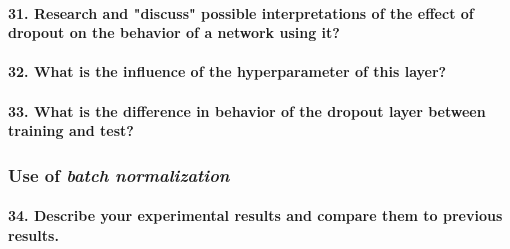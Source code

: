 \documentclass{article}
\theoremstyle{plain}%
\theoremstyle{definition}
\theoremstyle{remark}
\begin{document}
\paragraph{31. Research and "discuss" possible interpretations of the effect of dropout on the behavior of a network using it?}

\paragraph{32. What is the influence of the hyperparameter of this layer?}

\paragraph{33. What is the difference in behavior of the dropout layer between training and test?}

\subsubsection{Use of \textit{batch normalization}}

\paragraph{34. Describe your experimental results and compare them to previous results.}
\end{document}

